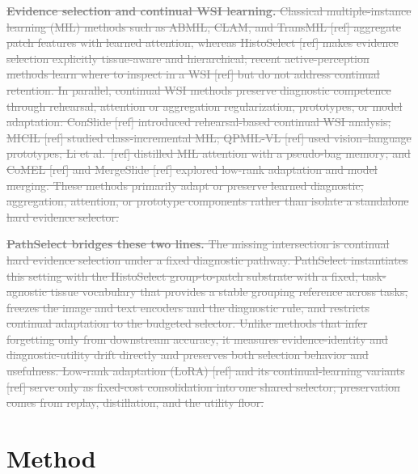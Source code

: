\documentclass{article}
\newif\ifmarkup \markuptrue
\newcommand{\repc}[3]{\ifmarkup\textcolor{gray}{\sout{#2}}\textcolor{#1}{#3}\else#3\fi}
\newcommand{\repG}[2]{\repc{teal}{#1}{#2}}    %
\begin{document}
\repG{\textbf{Evidence selection and continual WSI learning.}
Classical multiple-instance learning (MIL) methods such as ABMIL, CLAM, and TransMIL [ref] aggregate patch features with learned attention, whereas HistoSelect [ref] makes evidence selection explicitly tissue-aware and hierarchical; recent active-perception methods learn where to inspect in a WSI [ref] but do not address continual retention. In parallel, continual WSI methods preserve diagnostic competence through rehearsal, attention or aggregation regularization, prototypes, or model adaptation: ConSlide [ref] introduced rehearsal-based continual WSI analysis; MICIL [ref] studied class-incremental MIL; QPMIL-VL [ref] used vision--language prototypes; Li et al.\ [ref] distilled MIL attention with a pseudo-bag memory; and CoMEL [ref] and MergeSlide [ref] explored low-rank adaptation and model merging. These methods primarily adapt or preserve learned diagnostic, aggregation, attention, or prototype components rather than isolate a standalone hard evidence selector.}{}

\repG{\textbf{PathSelect bridges these two lines.}
The missing intersection is continual hard evidence selection under a fixed diagnostic pathway. PathSelect instantiates this setting with the HistoSelect group-to-patch substrate with a fixed, task-agnostic tissue vocabulary that provides a stable grouping reference across tasks, freezes the image and text encoders and the diagnostic rule, and restricts continual adaptation to the budgeted selector. Unlike methods that infer forgetting only from downstream accuracy, it measures evidence-identity and diagnostic-utility drift directly and preserves both selection behavior and usefulness. Low-rank adaptation (LoRA) [ref] and its continual-learning variants [ref] serve only as fixed-cost consolidation into one shared selector; preservation comes from replay, distillation, and the utility floor.}{}

\section{Method}
\label{sec:method}
\end{document}
